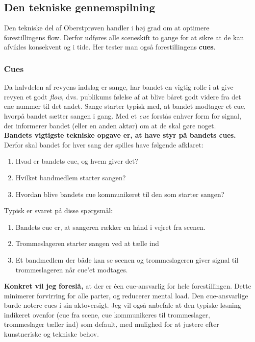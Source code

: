 \subsection{Den tekniske gennemspilning}
Den tekniske del af Oberstprøven handler i høj grad om at optimere forestillingens flow. Derfor udføres alle sceneskift to gange for at sikre at de kan afvikles konsekvent og i tide. Her tester man også forestillingens \textbf{cues}.
\subsubsection{Cues}
Da halvdelen af revyens indslag er sange, har bandet en vigtig rolle i at give revyen et godt \textit{flow}, dvs. publikums følelse af at blive båret godt videre fra det ene nummer til det andet. Sange starter typisk med, at bandet modtager et cue, hvorpå bandet sætter sangen i gang. Med et \textit{cue} forstås enhver form for signal, der informerer bandet  (eller en anden aktør) om at de skal gøre noget.
\\
\textbf{Bandets vigtigste tekniske opgave er, at have styr på bandets cues.}
\\
Derfor skal bandet for hver sang der spilles have følgende afklaret:
\begin{enumerate}
    \item Hvad er bandets cue, og hvem giver det?
    \item Hvilket bandmedlem starter sangen?
    \item Hvordan blive bandets cue kommunikeret til den som starter sangen?
\end{enumerate}
Typisk er svaret på disse spørgsmål:
\begin{enumerate}
    \item Bandets cue er, at sangeren rækker en hånd i vejret fra scenen.
    \item Trommeslageren starter sangen ved at tælle ind
    \item Et bandmedlem der både kan se scenen og trommeslageren giver signal til trommeslageren når cue'et modtages.
\end{enumerate}

\textbf{Konkret vil jeg foreslå,} at der er éen cue-ansvarlig for hele forestillingen. Dette minimerer forvirring for alle parter, og reducerer mental load. Den cue-ansvarlige burde notere cues i sin aktoversigt. Jeg vil også anbefale at den typiske løsning indikeret ovenfor (cue fra scene, cue kommunikeres til trommeslager, trommeslager tæller ind) som default, med mulighed for at justere efter kunstneriske og tekniske behov.


